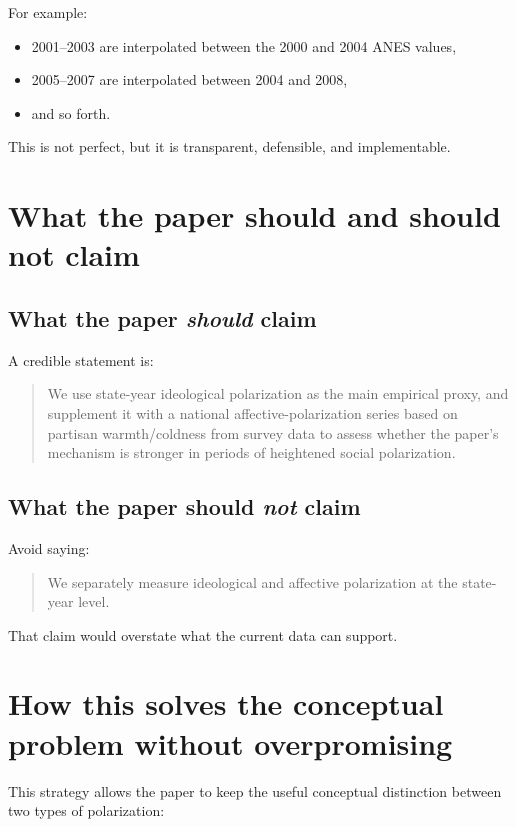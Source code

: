 \documentclass[12pt]{article}
\begin{document}
For example:
\begin{itemize}[leftmargin=1.5em]
    \item 2001--2003 are interpolated between the 2000 and 2004 ANES values,
    \item 2005--2007 are interpolated between 2004 and 2008,
    \item and so forth.
\end{itemize}

This is not perfect, but it is transparent, defensible, and implementable.

\section{What the paper should and should not claim}

\subsection{What the paper \emph{should} claim}

A credible statement is:

\begin{quote}
We use state-year ideological polarization as the main empirical proxy, and supplement it with a national affective-polarization series based on partisan warmth/coldness from survey data to assess whether the paper's mechanism is stronger in periods of heightened social polarization.
\end{quote}

\subsection{What the paper should \emph{not} claim}

Avoid saying:
\begin{quote}
We separately measure ideological and affective polarization at the state-year level.
\end{quote}

That claim would overstate what the current data can support.

\section{How this solves the conceptual problem without overpromising}

This strategy allows the paper to keep the useful conceptual distinction between two types of polarization:
\end{document}
